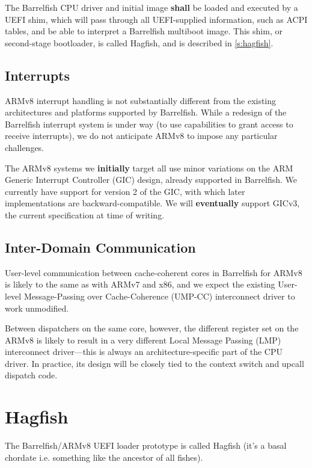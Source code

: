 \documentclass[a4paper,twoside]{report}
\begin{document}
The Barrelfish CPU driver and initial image \textbf{shall} be loaded and
executed by a UEFI shim, which will pass through all UEFI-supplied
information, such as ACPI tables, and be able to interpret a Barrelfish
multiboot image.  This shim, or second-stage bootloader, is called Hagfish,
and is described in \autoref{s:hagfish}.

\subsection{Interrupts}

ARMv8 interrupt handling is not substantially different from the existing
architectures and platforms supported by Barrelfish. While a redesign of the
Barrelfish interrupt system is under way (to use capabilities to grant access
to receive interrupts), we do not anticipate ARMv8 to impose any particular
challenges.

The ARMv8 systems we \textbf{initially} target all use minor variations on the
ARM Generic Interrupt Controller (GIC) design, already supported in
Barrelfish. We currently have support for version 2 of the GIC, with which
later implementations are backward-compatible. We will \textbf{eventually}
support GICv3, the current specification at time of writing.

\subsection{Inter-Domain Communication}

User-level communication between cache-coherent cores in Barrelfish for ARMv8
is likely to the same as with ARMv7 and x86, and we expect the existing
User-level Message-Passing over Cache-Coherence (UMP-CC) interconnect driver
to work unmodified.

Between dispatchers on the same core, however, the different register set on
the ARMv8 is likely to result in a very different Local Message Passing (LMP)
interconnect driver---this is always an architecture-specific part of the CPU
driver. In practice, its design will be closely tied to the context switch and
upcall dispatch code.

\section{Hagfish}\label{s:hagfish}

The Barrelfish/ARMv8 UEFI loader prototype is called Hagfish (it's a basal
chordate i.e. something like the ancestor of all fishes).
\end{document}
